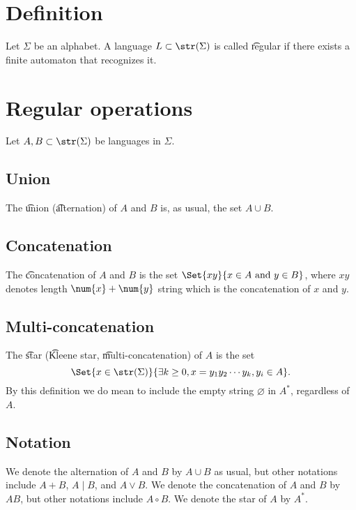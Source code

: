 
\section*{Definition}

Let $\Sigma $ be an alphabet.
A language $L \subset \str(\Sigma )$ is called \t{regular} if there exists a finite automaton that recognizes it.

\section*{Regular operations}

Let $A, B \subset \str(\Sigma )$ be languages in $\Sigma $.
  \subsection*  {Union  }

The \t{union} (\t{alternation}) of $A$ and $B$ is, as usual, the set $A \cup B$.
  \subsection*  {Concatenation  }

The \t{concatenation} of $A$ and $B$ is the set $\Set{xy}{x \in A \text{ and } y \in B}$, where $xy$ denotes length $\num{x}+\num{y}$ string which is the concatenation of $x$ and $y$.
  \subsection*  {Multi-concatenation  }

The \t{star} (\t{Kleene star}, \t{multi-concatenation}) of $A$ is the set
  \[
\Set{x \in \str(\Sigma )}{\exists k \geq 0, x = y_1y_2 \cdots y_k, y_i \in A}.
  \]
By this definition we do mean to include the empty string $\varnothing$ in $A^*$, regardless of $A$.

\subsection*{Notation}

We denote the alternation of $A$ and $B$ by $A \cup B$ as usual, but other notations include $A + B$, $A\mid  B$, and $A \lor B$.
We denote the concatenation of $A$ and $B$ by $AB$, but other notations include $A \circ B$.
We denote the star of $A$ by $A^*$.

\blankpage
